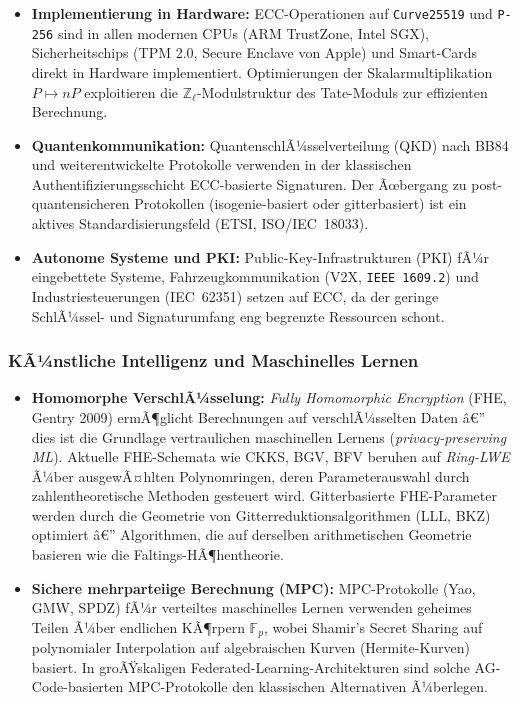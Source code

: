 ﻿\documentclass[12pt,a4paper]{article}
\theoremstyle{plain}
\theoremstyle{definition}
\theoremstyle{remark}
\newcommand{\Z}{\mathbb{Z}}
\newcommand{\F}{\mathbb{F}}
\begin{document}
\begin{itemize}[leftmargin=2em,itemsep=4pt]
  \item \textbf{Implementierung in Hardware:}
    ECC-Operationen auf \texttt{Curve25519} und \texttt{P-256} sind in
    allen modernen CPUs (ARM TrustZone, Intel SGX), Sicherheitschips
    (TPM 2.0, Secure Enclave von Apple) und Smart-Cards direkt in Hardware implementiert.
    Optimierungen der Skalarmultiplikation $P \mapsto nP$ exploitieren die
    $\Z_\ell$-Modulstruktur des Tate-Moduls zur effizienten Berechnung.

  \item \textbf{Quantenkommunikation:}
    QuantenschlÃ¼sselverteilung (QKD) nach BB84 und weiterentwickelte Protokolle
    verwenden in der klassischen Authentifizierungsschicht ECC-basierte Signaturen.
    Der Ãœbergang zu post-quantensicheren Protokollen (isogenie-basiert oder
    gitterbasiert) ist ein aktives Standardisierungsfeld (ETSI, ISO/IEC~18033).

  \item \textbf{Autonome Systeme und PKI:}
    Public-Key-Infrastrukturen (PKI) fÃ¼r eingebettete Systeme, Fahrzeugkommunikation
    (V2X, \texttt{IEEE~1609.2}) und Industriesteuerungen (IEC~62351)
    setzen auf ECC, da der geringe SchlÃ¼ssel- und Signaturumfang
    eng begrenzte Ressourcen schont.
\end{itemize}

\subsubsection{KÃ¼nstliche Intelligenz und Maschinelles Lernen}

\begin{itemize}[leftmargin=2em,itemsep=4pt]
  \item \textbf{Homomorphe VerschlÃ¼sselung:}
    \emph{Fully Homomorphic Encryption} (FHE, Gentry 2009) ermÃ¶glicht Berechnungen
    auf verschlÃ¼sselten Daten â€” dies ist die Grundlage vertraulichen maschinellen
    Lernens (\emph{privacy-preserving ML}).
    Aktuelle FHE-Schemata wie CKKS, BGV, BFV beruhen auf
    \emph{Ring-LWE} Ã¼ber ausgewÃ¤hlten Polynomringen, deren Parameterauswahl
    durch zahlentheoretische Methoden gesteuert wird.
    Gitterbasierte FHE-Parameter werden durch die Geometrie von
    Gitterreduktionsalgorithmen (LLL, BKZ) optimiert â€” Algorithmen,
    die auf derselben arithmetischen Geometrie basieren wie die
    Faltings-HÃ¶hentheorie.

  \item \textbf{Sichere mehrparteiige Berechnung (MPC):}
    MPC-Protokolle (Yao, GMW, SPDZ) fÃ¼r verteiltes maschinelles Lernen
    verwenden geheimes Teilen Ã¼ber endlichen KÃ¶rpern $\F_p$,
    wobei Shamir's Secret Sharing auf polynomialer Interpolation auf
    algebraischen Kurven (Hermite-Kurven) basiert.
    In groÃŸskaligen Federated-Learning-Architekturen sind solche AG-Code-basierten
    MPC-Protokolle den klassischen Alternativen Ã¼berlegen.
\end{itemize}
\end{document}
